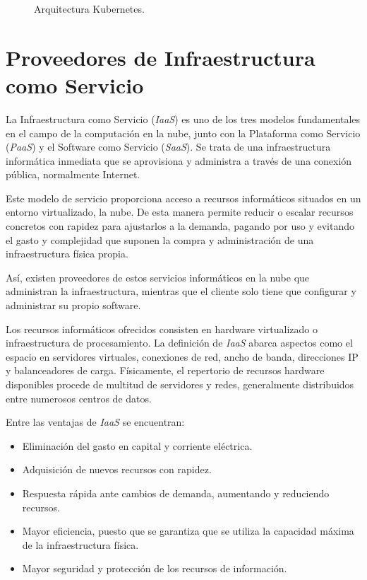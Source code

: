 \begin{figure}[H]
\caption{Arquitectura Kubernetes.\label{fig:figure_placement_example}}
\end{figure}

\section{Proveedores de Infraestructura como Servicio}

La Infraestructura como Servicio (\textit{IaaS}) es uno de los tres modelos fundamentales en el campo de la computación en la nube, junto con la Plataforma como Servicio (\textit{PaaS}) y el Software como Servicio (\textit{SaaS}). Se trata de una infraestructura informática inmediata que se aprovisiona y administra a través de una conexión pública, normalmente Internet.

Este modelo de servicio proporciona acceso a recursos informáticos situados en un entorno virtualizado, la nube. De esta manera permite reducir o escalar recursos  concretos con rapidez para ajustarlos a la demanda, pagando por uso y evitando el gasto y complejidad que suponen la compra y administración de una infraestructura física propia.

Así, existen proveedores de estos servicios informáticos en la nube que administran la infraestructura, mientras que el cliente solo tiene que configurar y administrar su propio software.

Los recursos informáticos ofrecidos consisten en hardware virtualizado o infraestructura de procesamiento. La definición de \textit{IaaS} abarca aspectos como el espacio en servidores virtuales, conexiones de red, ancho de banda, direcciones IP y balanceadores de carga. Físicamente, el repertorio de recursos hardware disponibles procede de multitud de servidores y redes, generalmente distribuidos entre numerosos centros de datos.

Entre las ventajas de \textit{IaaS} se encuentran:
\begin{itemize}
\item Eliminación del gasto en capital y corriente eléctrica.
\item Adquisición de nuevos recursos con rapidez.
\item Respuesta rápida ante cambios de demanda, aumentando y reduciendo recursos.
\item Mayor eficiencia, puesto que se garantiza que se utiliza la capacidad máxima de la infraestructura física.
\item Mayor seguridad y protección de los recursos de información.
\end{itemize}

